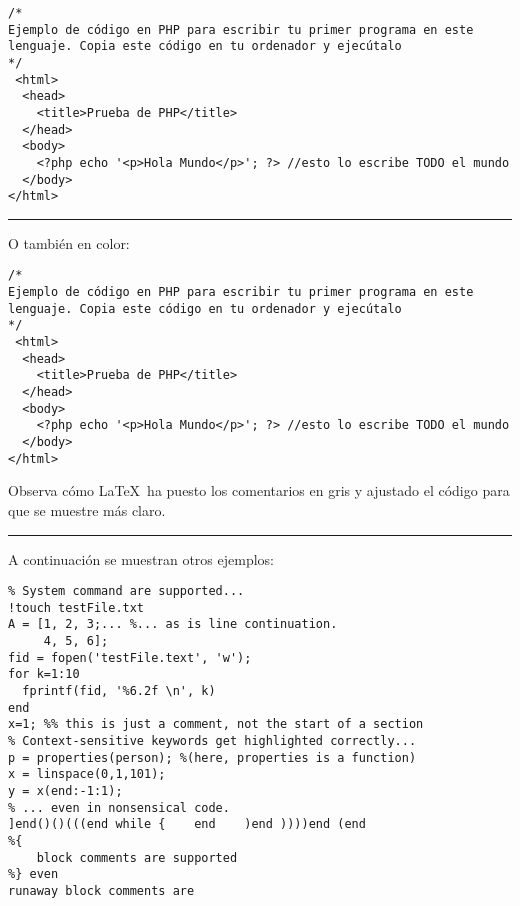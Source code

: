  \begin{lstlisting}[style=PHP, caption={ejemplo código PHP},label=PHP_code,firstnumber=100]
/* 
Ejemplo de código en PHP para escribir tu primer programa en este lenguaje. Copia este código en tu ordenador y ejecútalo
*/
 <html>
  <head>
    <title>Prueba de PHP</title>
  </head>
  <body>
    <?php echo '<p>Hola Mundo</p>'; ?> //esto lo escribe TODO el mundo
  </body>
</html>
 \end{lstlisting}
 \vspace{1em}
\noindent\hrule
\vspace{1em}
 O también en color: 
 \begin{lstlisting}[style=PHP-color, caption={ejemplo código PHP},label=PHP_code2]
/* 
Ejemplo de código en PHP para escribir tu primer programa en este lenguaje. Copia este código en tu ordenador y ejecútalo
*/
 <html>
  <head>
    <title>Prueba de PHP</title>
  </head>
  <body>
    <?php echo '<p>Hola Mundo</p>'; ?> //esto lo escribe TODO el mundo
  </body>
</html>
 \end{lstlisting}
 
 Observa cómo \LaTeX~ha puesto los comentarios en gris y ajustado el código para que se muestre más claro.
\vspace{1em}
\noindent\hrule
\vspace{1em}
 A continuación se muestran otros ejemplos:
 \begin{lstlisting}[style=Matlab-color, caption={ejemplo código Matlab en color},label=Matlab_code]
%% Code sections are highlighted.
% System command are supported...
!touch testFile.txt
A = [1, 2, 3;... %... as is line continuation.
     4, 5, 6];
fid = fopen('testFile.text', 'w');
for k=1:10
  fprintf(fid, '%6.2f \n', k)
end
x=1; %% this is just a comment, not the start of a section
% Context-sensitive keywords get highlighted correctly...
p = properties(person); %(here, properties is a function)
x = linspace(0,1,101);
y = x(end:-1:1);
% ... even in nonsensical code.
]end()()(((end while {    end    )end ))))end (end
%{
    block comments are supported
%} even
runaway block comments are
\end{lstlisting}

